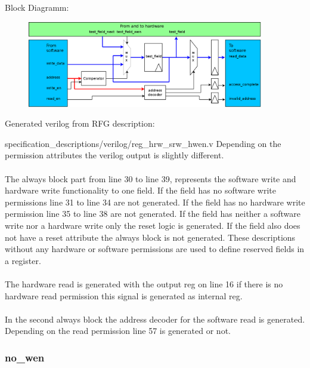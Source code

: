 \documentclass[12pt,a4paper]{article}
\begin{document}
Block Diagramm:
\begin{figure}[h!]
\includegraphics[width=0.92\textwidth]{pictures/Reg_hrw_srw_hwen.png}
\end{figure}
\newpage
Generated verilog from RFG description:

{specification_descriptions/verilog/reg_hrw_srw_hwen.v}
Depending on the permission attributes the verilog output is slightly different.\\
\\
The always block part from line 30 to line 39, represents the software write and hardware write functionality to one field. If the field has no software write permissions line 31 to line 34 are not generated. If the field has no hardware write permission line 35 to line 38 are not generated. If the field has neither a software write nor a hardware write only the reset logic is generated. If the field also does not have a reset attribute the always block is not generated. These descriptions without any hardware or software permissions are used to define reserved fields in a register.\\
\\
The hardware read is generated with the output reg on line 16 if there is no hardware read permission this signal is generated as internal reg.\\
\\
In the second always block the address decoder for the software read is generated. Depending on the read permission line 57 is generated or not.\\

\newpage

\subsubsection{no\_wen}
\end{document}
